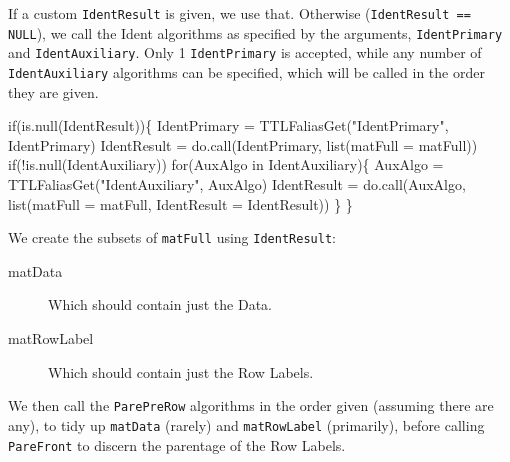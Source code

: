 \documentclass[a4paper]{article}
\begin{document}
If a custom \verb|IdentResult| is given, we use that. Otherwise
(\verb|IdentResult == NULL|), we call the Ident algorithms as
specified by the arguments, \verb|IdentPrimary| and
\verb|IdentAuxiliary|. Only 1 \verb|IdentPrimary| is accepted, while
any number of \verb|IdentAuxiliary| algorithms can be specified, which
will be called in the order they are given.

\nwenddocs{}\endmoddef
if(is.null(IdentResult))\{
  IdentPrimary = TTLFaliasGet("IdentPrimary", IdentPrimary)
  IdentResult = do.call(IdentPrimary, list(matFull = matFull))
  if(!is.null(IdentAuxiliary))
    for(AuxAlgo in IdentAuxiliary)\{
      AuxAlgo = TTLFaliasGet("IdentAuxiliary", AuxAlgo)
      IdentResult = do.call(AuxAlgo,
        list(matFull = matFull, IdentResult = IdentResult))
    \}
\}
\eatline
{}\nwendcode{}\nwdocspar

We create the subsets of \verb|matFull| using \verb|IdentResult|:
\begin{description}
\item[matData] Which should contain just the Data.
\item[matRowLabel] Which should contain just the Row Labels.
\end{description}

We then call the \verb|ParePreRow| algorithms in the order given
(assuming there are any), to tidy up \verb|matData| (rarely) and
\verb|matRowLabel| (primarily), before calling \verb|PareFront| to
discern the parentage of the Row Labels.
\end{document}
